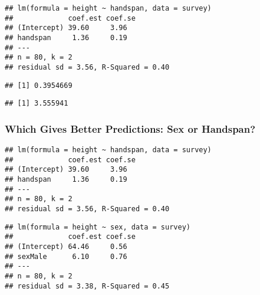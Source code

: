 \begin{frame}[fragile]
\footnotesize
\begin{knitrout}
\color{fgcolor}\begin{kframe}
\begin{alltt}
\end{alltt}
\begin{verbatim}
## lm(formula = height ~ handspan, data = survey)
##             coef.est coef.se
## (Intercept) 39.60     3.96  
## handspan     1.36     0.19  
## ---
## n = 80, k = 2
## residual sd = 3.56, R-Squared = 0.40
\end{verbatim}
\begin{alltt}
\hlopt{$}\hlopt{$}\hlopt{^}
\end{alltt}
\begin{verbatim}
## [1] 0.3954669
\end{verbatim}
\begin{alltt}
\hlstd{(}\hlopt{$}\hlopt{^}\hlstd{)} \hlopt{/} \hlstd{(} \hlopt{-} \hlstd{))}
\end{alltt}
\begin{verbatim}
## [1] 3.555941
\end{verbatim}
\end{kframe}
\end{knitrout}
\end{frame}
\begin{frame}[fragile]
\frametitle{Which Gives Better Predictions: Sex or Handspan?}

\scriptsize
\begin{knitrout}
\color{fgcolor}\begin{kframe}
\begin{verbatim}
## lm(formula = height ~ handspan, data = survey)
##             coef.est coef.se
## (Intercept) 39.60     3.96  
## handspan     1.36     0.19  
## ---
## n = 80, k = 2
## residual sd = 3.56, R-Squared = 0.40
\end{verbatim}
\end{kframe}
\end{knitrout}

\begin{knitrout}
\color{fgcolor}\begin{kframe}
\begin{verbatim}
## lm(formula = height ~ sex, data = survey)
##             coef.est coef.se
## (Intercept) 64.46     0.56  
## sexMale      6.10     0.76  
## ---
## n = 80, k = 2
## residual sd = 3.38, R-Squared = 0.45
\end{verbatim}
\end{kframe}
\end{knitrout}

\end{frame}
